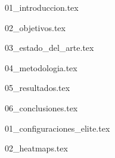 \documentclass[minitoc, hidelinks, headlogo, framedcover]{tfeEPCC}
\begin{document}


\pagestyle{fancy}
\setcounter{page}{1}

{01_introduccion.tex}

{02_objetivos.tex}

{03_estado_del_arte.tex}

{04_metodologia.tex}

{05_resultados.tex}

{06_conclusiones.tex}


\startappendices

{01_configuraciones_elite.tex}

{02_heatmaps.tex}

\pagebreak
\pagestyle{empty}
\makebibliography
\end{document}
